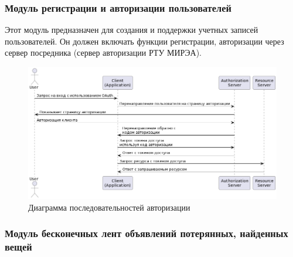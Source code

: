 \subsubsection{Модуль регистрации и авторизации пользователей}

Этот модуль предназначен для создания и поддержки учетных записей пользователей. Он должен включать функции регистрации, авторизации через сервер посредника (сервер авторизации РТУ МИРЭА).


\begin{figure}[htb]
	\centering
	\includegraphics[width=.9\textwidth]{images/registation-diagram.png}
	\parskip=6pt
	\caption{Диаграмма последовательностей авторизации}
	\label{fig:authDiagram}
\end{figure}

\subsubsection[Модуль\hspace*{10pt}бесконечных\hspace*{10pt}лент\hspace*{10pt}объявлений\hspace*{10pt}потерянных,\hspace*{10pt}найденных вещей]{Модуль бесконечных лент объявлений потерянных, найденных вещей}

